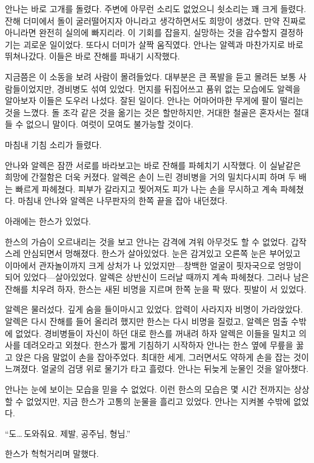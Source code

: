 안나는 바로 고개를 돌렸다. 주변에 아무런 소리도 없었으니 쇳소리는 꽤 크게 들렸다. 잔해 더미에서 돌이 굴러떨어지자 아니라고 생각하면서도 희망이 생겼다. 만약 진짜로 아니라면 완전히 실의에 빠지리라. 이 기회를 잡을지, 실망하는 것을 감수할지 결정하기는 괴로운 일이었다. 또다시 더미가 살짝 움직였다. 안나는 알렉과 마찬가지로 바로 뛰쳐나갔다. 이들은 바로 잔해를 파내기 시작했다.

지금쯤은 이 소동을 보려 사람이 몰려들었다. 대부분은 큰 폭발을 듣고 몰려든 보통 사람들이었지만, 경비병도 섞여 있었다. 먼지를 뒤집어쓰고 품위 없는 모습에도 알렉을 알아보자 이들은 도우러 나섰다. 잘된 일이다. 안나는 어마어마한 무게에 팔이 떨리는 것을 느꼈다. 돌 조각 같은 것을 옮기는 것은 할만하지만, 거대한 철골은 혼자서는 절대 들 수 없으니 말이다. 여럿이 모여도 불가능할 것이다.

마침내 기침 소리가 들렸다.

안나와 알렉은 잠깐 서로를 바라보고는 바로 잔해를 파헤치기 시작했다. 이 실낱같은 희망에 간절함은 더욱 커졌다. 알렉은 손이 느린 경비병을 거의 밀치다시피 하며 두 배는 빠르게 파헤쳤다. 피부가 갈라지고 찢어져도 피가 나는 손을 무시하고 계속 파헤쳤다. 마침내 안나와 알렉은 나무판자의 한쪽 끝을 잡아 내던졌다.

아래에는 한스가 있었다.

한스의 가슴이 오르내리는 것을 보고 안나는 감격에 겨워 아무것도 할 수 없었다. 갑작스레 안심되면서 멍해졌다. 한스가 살아있었다. 눈은 감겨있고 오른쪽 눈은 부어있고 이마에서 관자놀이까지 크게 상처가 나 있었지만—창백한 얼굴이 핏자국으로 엉망이 되어 있었다—살아있었다. 알렉은 상반신이 드러날 때까지 계속 파헤쳤다. 그러나 남은 잔해를 치우려 하자, 한스는 새된 비명을 지르며 한쪽 눈을 팍 떴다. 핏발이 서 있었다.

알렉은 물러섰다. 깊게 숨을 들이마시고 있었다. 압력이 사라지자 비명이 가라앉았다. 알렉은 다시 잔해를 들어 올리려 했지만 한스는 다시 비명을 질렀고, 알렉은 멈출 수밖에 없었다. 경비병들이 자신이 하던 대로 한스를 꺼내려 하자 알렉은 이들을 밀치고 의사를 데려오라고 외쳤다. 한스가 짧게 기침하기 시작하자 안나는 한스 옆에 무릎을 꿇고 앉은 다음 말없이 손을 잡아주었다. 최대한 세게, 그러면서도 약하게 손을 잡는 것이 느껴졌다. 얼굴의 검댕 위로 물기가 타고 흘렀다. 안나는 뒤늦게 눈물인 것을 알아챘다.

안나는 눈에 보이는 모습을 믿을 수 없었다. 이런 한스의 모습은 몇 시간 전까지는 상상할 수 없었지만, 지금 한스가 고통의 눈물을 흘리고 있었다. 안나는 지켜볼 수밖에 없었다.

``도\ldots\,도와줘요. 제발, 공주님, 형님.''

한스가 헉헉거리며 말했다.

